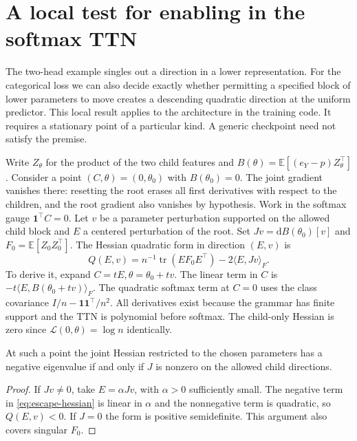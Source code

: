 \section{A local test for enabling in the softmax TTN}
\label{sec:escape}
The two-head example singles out a direction in a lower representation.
For the categorical loss we can also decide exactly whether permitting
a specified block of lower parameters to move creates a descending
quadratic direction at the uniform predictor. This local result applies
to the architecture in the training code. It requires a stationary point
of a particular kind. A generic checkpoint need not satisfy the premise.

Write $Z_\theta$ for the product of the two child features and
$B(\theta)=\mathbb E[(e_Y-p)Z_\theta^\top]$.
Consider a point $(C,\theta)=(0,\theta_0)$ with $B(\theta_0)=0$.
The joint gradient vanishes there: resetting the root erases all
first derivatives with respect to the children, and the root gradient
also vanishes by hypothesis. Work in the softmax gauge
$\mathbf1^\top C=0$. Let $v$ be a parameter perturbation supported on
the allowed child block and $E$ a centered perturbation of the root.
Set $Jv=\mathrm d B(\theta_0)[v]$ and $F_0=\mathbb E[Z_0Z_0^\top]$.
The Hessian quadratic form in direction $(E,v)$ is
\begin{equation}
 Q(E,v)=n^{-1}\operatorname{tr}(E F_0 E^\top)-2\langle E,Jv\rangle_F .
 \label{eq:escape-hessian}
\end{equation}
To derive it, expand $C=tE,\theta=\theta_0+tv$. The linear term
in $C$ is $-t\langle E,B(\theta_0+tv)\rangle_F$. The quadratic softmax
term at $C=0$ uses the class covariance $I/n-\mathbf1\mathbf1^\top/n^2$.
All derivatives exist because the grammar has finite support and the
TTN is polynomial before softmax. The child-only Hessian is zero since
$\mathcal L(0,\theta)=\log n$ identically.

\begin{proposition}
At such a point the joint Hessian restricted to the chosen parameters
has a negative eigenvalue if and only if $J$ is nonzero on the allowed
child directions.
\end{proposition}
\begin{proof}
If $Jv\ne0$, take $E=\alpha Jv$, with $\alpha>0$ sufficiently small.
The negative term in \eqref{eq:escape-hessian} is linear in $\alpha$ and
the nonnegative term is quadratic, so $Q(E,v)<0$. If $J=0$ the form is
positive semidefinite. This argument also covers singular $F_0$.
\end{proof}


